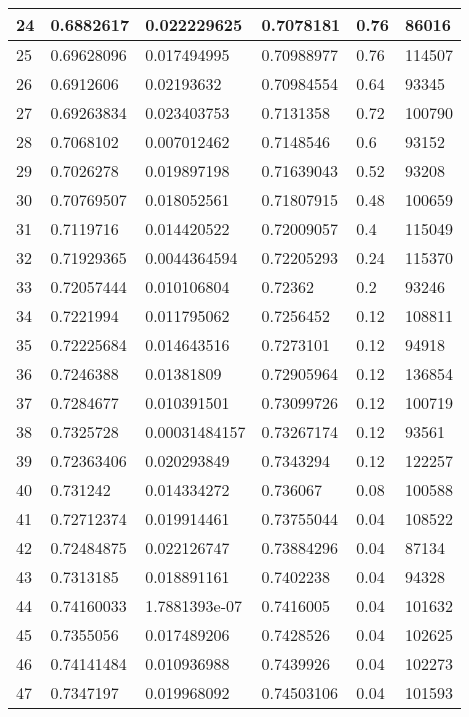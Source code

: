 \begin{longtable}{|l|l|l|l|l|l|}
24 & 0.6882617 & 0.022229625 & 0.7078181 & 0.76 & 86016 \\ \hline 
25 & 0.69628096 & 0.017494995 & 0.70988977 & 0.76 & 114507 \\ \hline 
26 & 0.6912606 & 0.02193632 & 0.70984554 & 0.64 & 93345 \\ \hline 
27 & 0.69263834 & 0.023403753 & 0.7131358 & 0.72 & 100790 \\ \hline 
28 & 0.7068102 & 0.007012462 & 0.7148546 & 0.6 & 93152 \\ \hline 
29 & 0.7026278 & 0.019897198 & 0.71639043 & 0.52 & 93208 \\ \hline 
30 & 0.70769507 & 0.018052561 & 0.71807915 & 0.48 & 100659 \\ \hline 
31 & 0.7119716 & 0.014420522 & 0.72009057 & 0.4 & 115049 \\ \hline 
32 & 0.71929365 & 0.0044364594 & 0.72205293 & 0.24 & 115370 \\ \hline 
33 & 0.72057444 & 0.010106804 & 0.72362 & 0.2 & 93246 \\ \hline 
34 & 0.7221994 & 0.011795062 & 0.7256452 & 0.12 & 108811 \\ \hline 
35 & 0.72225684 & 0.014643516 & 0.7273101 & 0.12 & 94918 \\ \hline 
36 & 0.7246388 & 0.01381809 & 0.72905964 & 0.12 & 136854 \\ \hline 
37 & 0.7284677 & 0.010391501 & 0.73099726 & 0.12 & 100719 \\ \hline 
38 & 0.7325728 & 0.00031484157 & 0.73267174 & 0.12 & 93561 \\ \hline 
39 & 0.72363406 & 0.020293849 & 0.7343294 & 0.12 & 122257 \\ \hline 
40 & 0.731242 & 0.014334272 & 0.736067 & 0.08 & 100588 \\ \hline 
41 & 0.72712374 & 0.019914461 & 0.73755044 & 0.04 & 108522 \\ \hline 
42 & 0.72484875 & 0.022126747 & 0.73884296 & 0.04 & 87134 \\ \hline 
43 & 0.7313185 & 0.018891161 & 0.7402238 & 0.04 & 94328 \\ \hline 
44 & 0.74160033 & 1.7881393e-07 & 0.7416005 & 0.04 & 101632 \\ \hline 
45 & 0.7355056 & 0.017489206 & 0.7428526 & 0.04 & 102625 \\ \hline 
46 & 0.74141484 & 0.010936988 & 0.7439926 & 0.04 & 102273 \\ \hline 
47 & 0.7347197 & 0.019968092 & 0.74503106 & 0.04 & 101593 \\ \hline 

\end{longtable}
